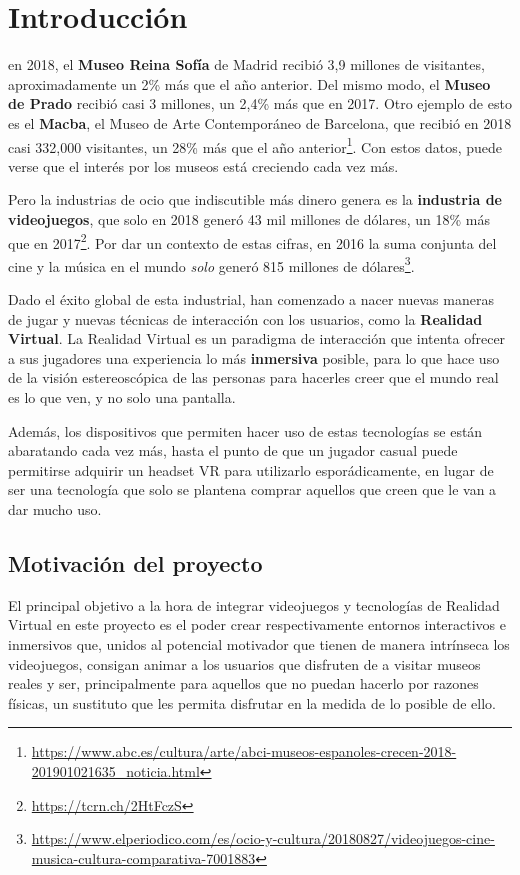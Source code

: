 \chapter{Introducción}
\label{chap:introduccion}

 en 2018, el \textbf{Museo Reina Sofía} de Madrid recibió 3,9 millones de visitantes, aproximadamente un 2\% más que el año anterior. Del mismo modo, el \textbf{Museo de Prado} recibió casi 3 millones, un 2,4\% más que en 2017. Otro ejemplo de esto es el \textbf{Macba}, el Museo de Arte Contemporáneo de Barcelona, que recibió en 2018 casi 332,000 visitantes, un 28\% más que el año anterior\footnote{\url{https://www.abc.es/cultura/arte/abci-museos-espanoles-crecen-2018-201901021635_noticia.html}}. Con estos datos, puede verse que el interés por los museos está creciendo cada vez más.

Pero la industrias de ocio que indiscutible más dinero genera es la \textbf{industria de videojuegos}, que solo en 2018 generó 43 mil millones de dólares, un 18\% más que en 2017\footnote{\url{https://tcrn.ch/2HtFczS}}. Por dar un contexto de estas cifras, en 2016 la suma conjunta del cine y la música en el mundo \textit{solo} generó 815 millones de dólares\footnote{\url{https://www.elperiodico.com/es/ocio-y-cultura/20180827/videojuegos-cine-musica-cultura-comparativa-7001883}}.

Dado el éxito global de esta industrial, han comenzado a nacer nuevas maneras de jugar y nuevas técnicas de interacción con los usuarios, como la \textbf{Realidad Virtual}. La Realidad Virtual es un paradigma de interacción que intenta ofrecer a sus jugadores una experiencia lo más \textbf{inmersiva} posible, para lo que hace uso de la visión estereoscópica de las personas para hacerles creer que el mundo real es lo que ven, y no solo una pantalla.

Además, los dispositivos que permiten hacer uso de estas tecnologías se están abaratando cada vez más, hasta el punto de que un jugador casual puede permitirse adquirir un headset \acs{VR} para utilizarlo esporádicamente, en lugar de ser una tecnología que solo se plantena comprar aquellos que creen que le van a dar mucho uso.

\section{Motivación del proyecto}

El principal objetivo a la hora de integrar videojuegos y tecnologías de Realidad Virtual en este proyecto es el poder crear respectivamente entornos interactivos e inmersivos que, unidos al potencial motivador que tienen de manera intrínseca los videojuegos, consigan animar a los usuarios que disfruten de \MineRVa a visitar museos reales y ser, principalmente para aquellos que no puedan hacerlo por razones físicas, un sustituto que les permita disfrutar en la medida de lo posible de ello. 

